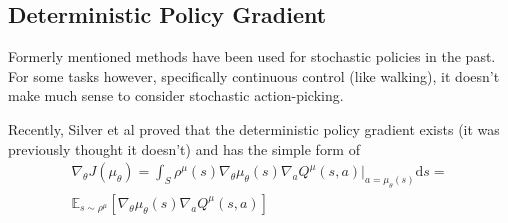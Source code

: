 \subsection{Deterministic Policy Gradient}
Formerly mentioned methods have been used for stochastic policies in the past. For some tasks however, specifically continuous control (like walking), it doesn't make much sense to consider stochastic action-picking.

Recently, Silver et al \cite{cite:DPG} proved that the deterministic policy gradient exists (it was previously thought it doesn't) and has the simple form of 
\begin{equation}
\begin{split}
\nabla_\theta J(\mu_\theta)= \int_S \rho^\mu(s) \nabla_\theta \mu_\theta(s) \nabla_aQ^\mu(s,a)|_{a=\mu_\theta(s)}\text{d}s=\\
\mathbb{E}_{s\sim\rho^\mu}[\nabla_\theta \mu_\theta(s) \nabla_aQ^\mu(s,a)]
\end{split}
\end{equation}


